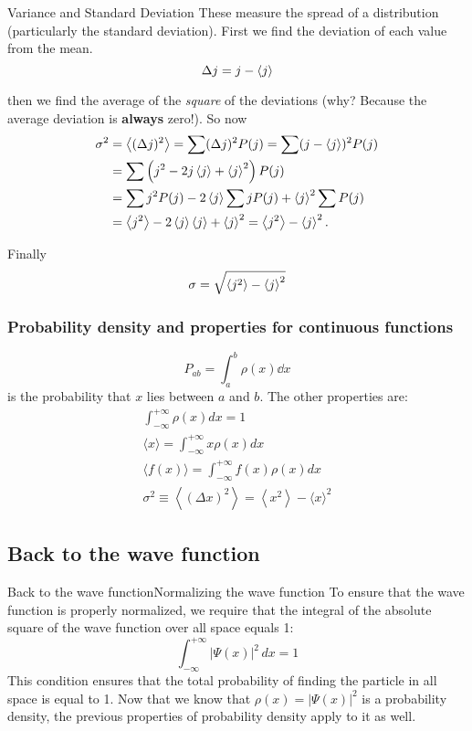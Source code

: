 \begin{frame}{Variance and Standard Deviation}
	These measure the spread of a distribution (particularly the standard deviation).
	First we find the deviation of each value from the mean.
	\[
		\Delta j = j - \ev j
	\]

	then we find the average of the \textit{square} of the deviations (why? Because the average deviation is \textbf{always} zero!). So now
	\begin{align*}
		\sigma^2 & =\ev{(\Delta j)^2} = \sum(\Delta j)^2 P(j)=\sum(j-\ev{j})^2 P(j) \\
		         & =\sum\left(j^2-2 j \ev{j} + \ev{j}^2\right) P(j)                 \\
		         & =\sum j^2 P(j)-2 \ev{j} \sum j P(j)+\ev{j}^2 \sum P(j)           \\
		         & =\ev{ j^2}-2\ev{ j}\ev{ j}+\ev{ j}^2=\ev{ j^2}-\ev{ j}^2 .
	\end{align*}

	Finally $$\sigma = \sqrt{\ev{ j^2}-\ev{ j}^2}$$
\end{frame}


\begin{frame}
	\frametitle{Probability density and properties for continuous functions}
	$$ P_{ab} = \int_a^b \rho(x) \dd{x}$$
	is the probability that $x$ lies between $a$ and $b$. The other properties are:
	\begin{gather}
		\int_{-\infty}^{+\infty} \rho(x) d x=1 \\
		\langle x\rangle=\int_{-\infty}^{+\infty} x \rho(x) d x \\
		\langle f(x)\rangle=\int_{-\infty}^{+\infty} f(x) \rho(x) d x \\
		\sigma^2 \equiv\left\langle(\Delta x)^2\right\rangle=\left\langle x^2\right\rangle-\langle x\rangle^2
	\end{gather}

\end{frame}

\subsection{Back to the wave function}

\begin{frame}{Back to the wave function}{Normalizing the wave function}
	To ensure that the wave function is properly normalized, we require that the integral of the absolute square of the wave function over all space equals 1:
	\begin{equation*}
		\int_{-\infty}^{+\infty} |\Psi(x)|^2 \, dx = 1
	\end{equation*}
	This condition ensures that the total probability of finding the particle in all space is equal to 1.
	Now that we know that $\rho(x) = |\Psi(x)|^2$ is a probability density, the previous properties of probability density apply to it as well.
\end{frame}


